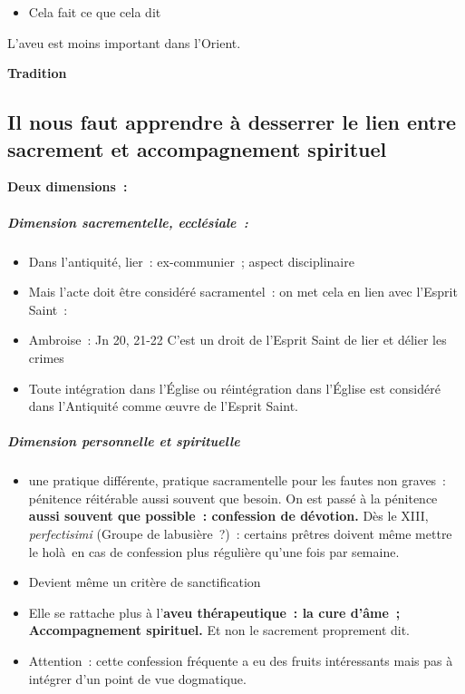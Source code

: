 \begin{itemize}
\item
  Cela fait ce que cela dit
\end{itemize}

L'aveu est moins important dans l'Orient.

\textbf{Tradition}

\hypertarget{il-nous-faut-apprendre-uxe0-desserrer-le-lien-entre-sacrement-et-accompagnement-spirituel}{%
\subsection{Il nous faut apprendre à desserrer le lien entre sacrement
et accompagnement
spirituel}\label{il-nous-faut-apprendre-uxe0-desserrer-le-lien-entre-sacrement-et-accompagnement-spirituel}}

\textbf{Deux dimensions~:}

\hypertarget{dimension-sacrementelle-eccluxe9siale}{%
\subparagraph{\texorpdfstring{Dimension sacrementelle, ecclésiale~:
}{Dimension sacrementelle, ecclésiale~: }}\label{dimension-sacrementelle-eccluxe9siale}}

\begin{itemize}
\item
  Dans l'antiquité, lier~: ex-communier~; aspect disciplinaire
\item
  Mais l'acte doit être considéré sacramentel~: on met cela en lien avec
  l'Esprit Saint~:
\item
   
  Ambroise~: Jn 20, 21-22 C'est un droit de l'Esprit Saint de lier et
  délier les crimes
   
\item
   
  Toute intégration dans l'Église ou réintégration dans l'Église est
  considéré dans l'Antiquité comme œuvre de l'Esprit Saint.
   
\end{itemize}

\hypertarget{dimension-personnelle-et-spirituelle}{%
\subparagraph{Dimension personnelle et
spirituelle}\label{dimension-personnelle-et-spirituelle}}

\begin{itemize}
\item
  une pratique différente, pratique sacramentelle pour les fautes non
  graves~: pénitence réitérable aussi souvent que besoin. On est passé à
  la pénitence \textbf{aussi souvent que possible~: confession de
  dévotion.} Dès le XIII, \emph{perfectisimi} (Groupe de labusière~?)~:
  certains prêtres doivent même mettre le holà~en cas de confession plus
  régulière qu'une fois par semaine.
\item
  Devient même un critère de sanctification
\item
  Elle se rattache plus à l'\textbf{aveu thérapeutique~: la cure d'âme~;
  Accompagnement spirituel.} Et non le sacrement proprement dit.
\item
  Attention~: cette confession fréquente a eu des fruits intéressants
  mais pas à intégrer d'un point de vue dogmatique.
\end{itemize}


